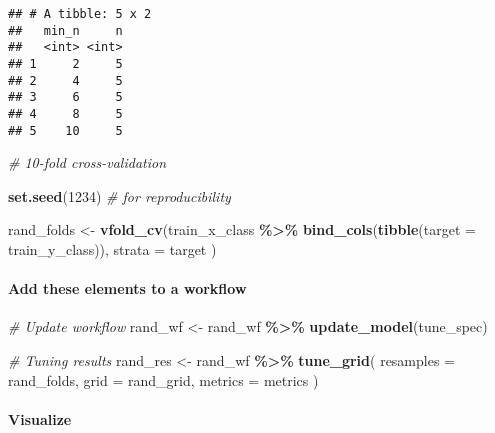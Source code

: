 \documentclass[
]{book}
\newenvironment{Shaded}{\begin{snugshade}}{\end{snugshade}}
\newcommand{\CommentTok}[1]{\textcolor[rgb]{0.56,0.35,0.01}{\textit{#1}}}
\newcommand{\DataTypeTok}[1]{\textcolor[rgb]{0.13,0.29,0.53}{#1}}
\newcommand{\DecValTok}[1]{\textcolor[rgb]{0.00,0.00,0.81}{#1}}
\newcommand{\KeywordTok}[1]{\textcolor[rgb]{0.13,0.29,0.53}{\textbf{#1}}}
\newcommand{\NormalTok}[1]{#1}
\newcommand{\OperatorTok}[1]{\textcolor[rgb]{0.81,0.36,0.00}{\textbf{#1}}}
\newcommand{\StringTok}[1]{\textcolor[rgb]{0.31,0.60,0.02}{#1}}
\begin{document}
\begin{verbatim}
## # A tibble: 5 x 2
##   min_n     n
##   <int> <int>
## 1     2     5
## 2     4     5
## 3     6     5
## 4     8     5
## 5    10     5
\end{verbatim}

\begin{Shaded}
\begin{Highlighting}[]
\CommentTok{\# 10{-}fold cross{-}validation}

\KeywordTok{set.seed}\NormalTok{(}\DecValTok{1234}\NormalTok{) }\CommentTok{\# for reproducibility}

\NormalTok{rand\_folds \textless{}{-}}\StringTok{ }\KeywordTok{vfold\_cv}\NormalTok{(train\_x\_class }\OperatorTok{\%\textgreater{}\%}\StringTok{ }\KeywordTok{bind\_cols}\NormalTok{(}\KeywordTok{tibble}\NormalTok{(}\DataTypeTok{target =}\NormalTok{ train\_y\_class)),}
  \DataTypeTok{strata =}\NormalTok{ target}
\NormalTok{)}
\end{Highlighting}
\end{Shaded}

\hypertarget{add-these-elements-to-a-workflow-2}{%
\paragraph{Add these elements to a workflow}\label{add-these-elements-to-a-workflow-2}}

\begin{Shaded}
\begin{Highlighting}[]
\CommentTok{\# Update workflow}
\NormalTok{rand\_wf \textless{}{-}}\StringTok{ }\NormalTok{rand\_wf }\OperatorTok{\%\textgreater{}\%}\StringTok{ }\KeywordTok{update\_model}\NormalTok{(tune\_spec)}

\CommentTok{\# Tuning results}
\NormalTok{rand\_res \textless{}{-}}\StringTok{ }\NormalTok{rand\_wf }\OperatorTok{\%\textgreater{}\%}
\StringTok{  }\KeywordTok{tune\_grid}\NormalTok{(}
    \DataTypeTok{resamples =}\NormalTok{ rand\_folds,}
    \DataTypeTok{grid =}\NormalTok{ rand\_grid,}
    \DataTypeTok{metrics =}\NormalTok{ metrics}
\NormalTok{  )}
\end{Highlighting}
\end{Shaded}

\hypertarget{visualize-2}{%
\paragraph{Visualize}\label{visualize-2}}
\end{document}
